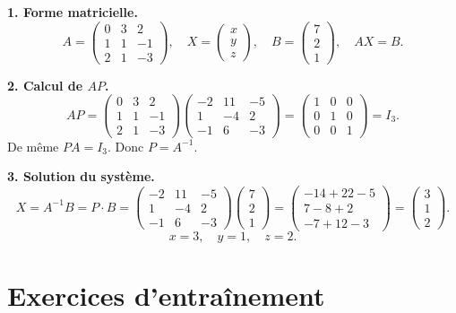 \solution

\textbf{1. Forme matricielle.}
\[
A = \begin{pmatrix}0&3&2\\1&1&-1\\2&1&-3\end{pmatrix}, \quad
X = \begin{pmatrix}x\\y\\z\end{pmatrix}, \quad
B = \begin{pmatrix}7\\2\\1\end{pmatrix}, \quad
AX = B.
\]

\textbf{2. Calcul de $AP$.}
\[
AP =
\begin{pmatrix}0&3&2\\1&1&-1\\2&1&-3\end{pmatrix}
\begin{pmatrix}-2&11&-5\\1&-4&2\\-1&6&-3\end{pmatrix}
= \begin{pmatrix}1&0&0\\0&1&0\\0&0&1\end{pmatrix} = I_3.
\]
De même $PA = I_3$. Donc $P = A^{-1}$.

\textbf{3. Solution du système.}
\[
X = A^{-1}B = P\cdot B
= \begin{pmatrix}-2&11&-5\\1&-4&2\\-1&6&-3\end{pmatrix}
\begin{pmatrix}7\\2\\1\end{pmatrix}
= \begin{pmatrix}-14+22-5\\7-8+2\\-7+12-3\end{pmatrix}
= \begin{pmatrix}3\\1\\2\end{pmatrix}.
\]
\[
\boxed{x = 3, \quad y = 1, \quad z = 2.}
\]


\section{Exercices d'entraînement}

